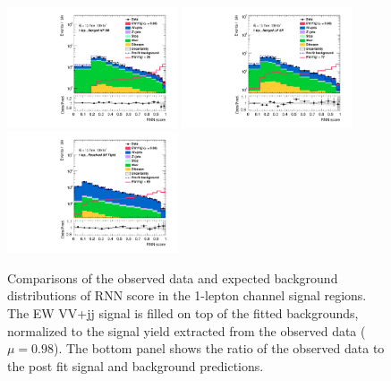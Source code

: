 \begin{figure}[]
    \centering
    \includegraphics[width=0.45\textwidth]{figures/PostFit/Region_distRNN_DSRVBSHP_BMin0_J0_incJet1_L1_T0_incFat1_Y6051_incTag1_Fat1_GlobalFit_unconditionnal_mu1log}
    \includegraphics[width=0.45\textwidth]{figures/PostFit/Region_distRNN_DSRVBSLP_BMin0_J0_incJet1_L1_T0_incFat1_Y6051_incTag1_Fat1_GlobalFit_unconditionnal_mu1log}
    \includegraphics[width=0.45\textwidth]{figures/PostFit/Region_distRNN_DSRVBSTight_BMin0_T0_Y6051_incTag1_J2_L1_incJet1_GlobalFit_unconditionnal_mu1log}
      \caption{Comparisons of the observed data and expected background distributions of RNN score in the 1-lepton channel signal regions. The EW VV+jj signal is filled on top of the fitted backgrounds, normalized to the signal yield extracted from the observed data ($\mu = 0.98$). The bottom panel shows the ratio of the observed data to the post fit signal and background predictions.}
      \label{fig:postSR1lep}
\end{figure}
